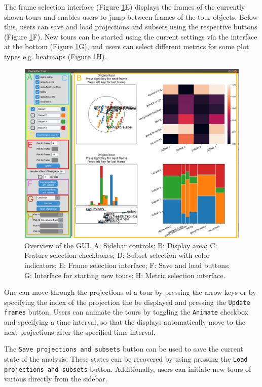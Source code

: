 \documentclass[article]{ajs}
\begin{document}
The frame selection interface (Figure \ref{fig:GUI_overview}E) displays the frames of the currently shown tours and enables users to jump between frames of the tour objects. Below this, users can save and load projections and subsets using the respective buttons (Figure \ref{fig:GUI_overview}F). New tours can be started using the current settings via the interface at the bottom (Figure \ref{fig:GUI_overview}G), and users can select different metrics for some plot types e.g. heatmaps (Figure \ref{fig:GUI_overview}H).

\begin{figure}[h!]
    \centering
    \includegraphics[width=1\textwidth]{GUI_overview.png}
    \caption{Overview of the GUI. A: Sidebar controls; B: Display area; C: Feature selection checkboxes; D: Subset selection with color indicators; E: Frame selection interface; F: Save and load buttons; G: Interface for starting new tours; H: Metric selection interface.}
    \label{fig:GUI_overview}
\end{figure}


One can move through the projections of a tour by pressing the arrow keys or by specifying the index of the projection the be displayed and pressing the \texttt{Update frames} button. Users can animate the tours by toggling the \texttt{Animate} checkbox and specifying a time interval, so that the displays automatically move to the next projections after the specified time interval.

The \texttt{Save projections and subsets} button can be used to save the current state of the analysis. These states can be recovered by using pressing the \texttt{Load projections and subsets} button. Additionally, users can initiate new tours of various directly from the sidebar.
\end{document}
